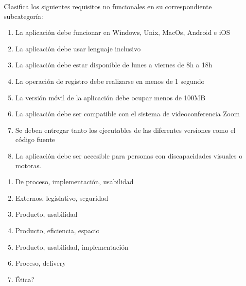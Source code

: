 

\begin{enunciado}
    Clasifica los siguientes requisitos no funcionales en su correspondiente subcategoría:
    \begin{enumerate}
        \item La aplicación debe funcionar en Windows, Unix, MacOs, Android e iOS
        \item La aplicación debe usar lenguaje inclusivo
        \item La aplicación debe estar disponible de lunes a viernes de 8h a 18h
        \item La operación de registro debe realizarse en menos de 1 segundo
        \item La versión móvil de la aplicación debe ocupar menos de 100MB
        \item La aplicación debe ser compatible con el sistema de videoconferencia Zoom
        \item Se deben entregar tanto los ejecutables de las diferentes versiones como el código fuente
        \item La aplicación debe ser accesible para personas con discapacidades visuales o motoras.
    \end{enumerate}
\end{enunciado}

\begin{solucion}
    \begin{enumerate}
        \item De proceso, implementación, usabilidad
        \item Externos, legislativo, seguridad
        \item Producto, usabilidad
        \item Producto, eficiencia, espacio
        \item Producto, usabilidad, implementación
        \item Proceso, delivery
        \item Ética?
    \end{enumerate}
\end{solucion}